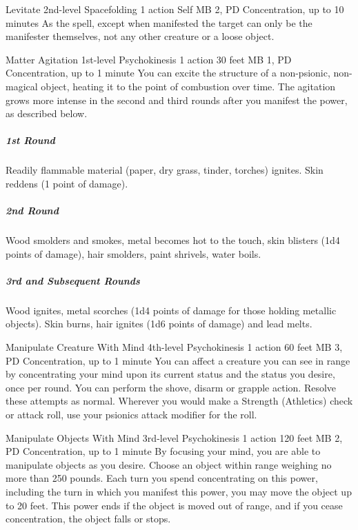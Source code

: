 \DndPowerHeader%
  {Levitate}
  {2nd-level Spacefolding}
  {1 action}
  {Self}
  {MB 2, PD \lvltwo}
  {Concentration, up to 10 minutes}
As the  spell,
except when manifested the target can only be the manifester themselves,
not any other creature or a loose object.

\DndPowerHeader%
  {Matter Agitation}
  {1st-level Psychokinesis}
  {1 action}
  {30 feet}
  {MB 1, PD \lvlone}
  {Concentration, up to 1 minute}
  You can excite the structure of a non-psionic,
  non-magical object,
  heating it to the point of combustion over time.
  The agitation grows more intense in the second and third rounds
  after you manifest the power, as described below.

  \subparagraph{1st Round}
    Readily flammable material
    (paper, dry grass, tinder, torches) ignites.
    Skin reddens (1 point of damage).
  \subparagraph{2nd Round}
    Wood smolders and smokes,
    metal becomes hot to the touch,
    skin blisters (1d4 points of damage),
    hair smolders, paint shrivels, water boils.
  \subparagraph{3rd and Subsequent Rounds}
    Wood ignites, metal scorches
    (1d4 points of damage for those holding metallic objects).
    Skin burns, hair ignites (1d6 points of damage) and lead melts.

\DndPowerHeader%
  {Manipulate Creature With Mind}
  {4th-level Psychokinesis}
  {1 action}
  {60 feet}
  {MB 3, PD \lvlfour}
  {Concentration, up to 1 minute}
You can affect a creature you can see in range by
concentrating your mind upon its current status
and the status you desire, once per round.
You can perform the shove, disarm or grapple action.
Resolve these attempts as normal.
Wherever you would make a Strength (Athletics) check or attack roll,
use your psionics attack modifier for the roll.
  
  \DndPowerHeader%
    {Manipulate Objects With Mind}
    {3rd-level Psychokinesis}
    {1 action}
    {120 feet}
    {MB 2, PD \lvlthree}
    {Concentration, up to 1 minute}
  By focusing your mind, you are able to manipulate objects as you desire.
  Choose an object within range weighing no more than 250 pounds.
  Each turn you spend concentrating on this power,
  including the turn in which you manifest this power,
  you may move the object up to 20 feet.
  This power ends if the object is moved out of range,
  and if you cease concentration,
  the object falls or stops.

